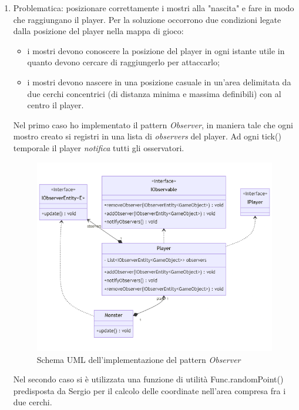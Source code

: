 \documentclass[a4paper,12pt]{report}
\begin{document}
\begin{enumerate}
\item Problematica: posizionare correttamente i mostri alla "nascita" e fare in modo che raggiungano il player.
%
Per la soluzione occorrono due condizioni legate dalla posizione del player nella mappa di gioco:
\begin{itemize}
	\item i mostri devono conoscere la posizione del player in ogni istante utile in quanto devono cercare di raggiungerlo per attaccarlo;
	\item i mostri devono nascere in una posizione casuale in un'area delimitata da due cerchi concentrici (di distanza minima e massima definibili) con al centro il player.
\end{itemize}
Nel primo caso ho implementato il pattern \emph{Observer}, in maniera tale che ogni mostro creato si registri in una lista di \emph{observers} del player. Ad ogni tick() temporale il player \emph{notifica} tutti gli osservatori. 

\begin{figure}[H]
	\centering{}
\includegraphics[width=\textwidth]{img/monsterObserver.png}
	\caption{Schema UML dell'implementazione del pattern \emph{Observer}}
\label{img:Observer Pattern}
\end{figure}

Nel secondo caso si è utilizzata una funzione di utilità Func.randomPoint() predisposta da Sergio per il calcolo delle coordinate nell'area compresa fra i due cerchi.	


\end{enumerate}
\end{document}
